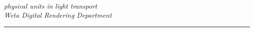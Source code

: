 
\pagestyle{fancy}
\lhead{}
\chead{\leftmark}
\rhead{\physLight}
\cfoot{\textsc{\physLightVersion}}

\renewcommand{\headrulewidth}{.4pt}
\renewcommand{\footrulewidth}{.4pt}

%

\renewcommand{\d}{\mathop{}\!\mathrm{d}}

\newcommand{\todo}[1]{\begin{tcolorbox}[colback=red!5!white,colframe=red!75!black,title=TODO]{#1}\end{tcolorbox}}


\begin{titlepage}
\begin{center}

{\fontsize{60}{72}\selectfont \physLight}\\[.3cm]

\textsf{\textit{\fontsize{24}{26.8}\selectfont physical units in light transport}}\\[1.5cm]

\vfill
\large
\textit{Weta Digital Rendering Department}\\[1mm]

%

\hrule \vspace{1mm}
\textsc{\large \physLightVersion}\\[0.5cm]

\end{center}
\end{titlepage}

